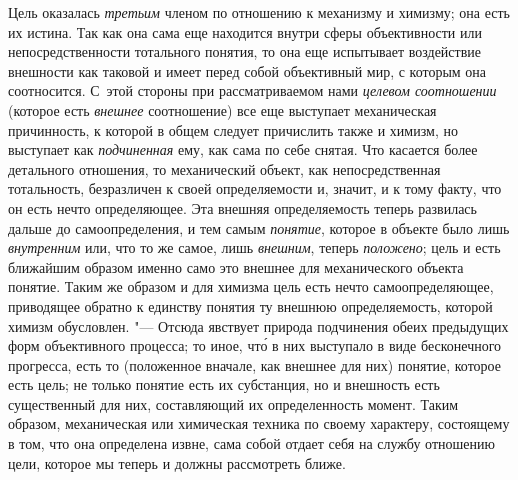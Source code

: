 Цель оказалась
{\em третьим} членом по
отношению к механизму и химизму; она есть их истина. Так как она сама еще
находится внутри сферы объективности или непосредственности тотального
понятия, то она еще испытывает воздействие внешности как таковой и имеет
перед собой объективный мир, с которым она соотносится. С~этой стороны при
рассматриваемом нами {\em целевом
соотношении} (которое есть
{\em внешнее}
соотношение) все еще выступает механическая причинность, к
которой в общем следует причислить также и химизм, но выступает как
{\em подчиненная} ему,
как сама по себе снятая. Что касается более детального отношения, то
механический объект, как непосредственная тотальность, безразличен к своей
определяемости и, значит, и к тому факту, что он есть нечто определяющее.
Эта внешняя определяемость теперь развилась дальше до самоопределения, и
тем самым {\em понятие},
которое в объекте было лишь
{\em внутренним} или, что
то же самое, лишь {\em внешним},
теперь {\em положено};
цель и есть ближайшим образом именно само это внешнее для
механического объекта понятие. Таким же образом и для химизма цель есть
нечто самоопределяющее, приводящее обратно к единству понятия ту внешнюю
определяемость, которой химизм обусловлен. "--- Отсюда явствует
природа подчинения обеих предыдущих форм объективного процесса; то иное, чт\'{о}
 в них выступало в виде бесконечного прогресса, есть то (положенное
вначале, как внешнее для них) понятие, которое есть цель; не только понятие
есть их субстанция, но и внешность есть существенный для них, составляющий
их определенность момент. Таким образом, механическая или
химическая техника по своему характеру, состоящему в том, что она
определена извне, сама собой отдает себя на службу отношению цели, которое
мы теперь и должны рассмотреть ближе.

